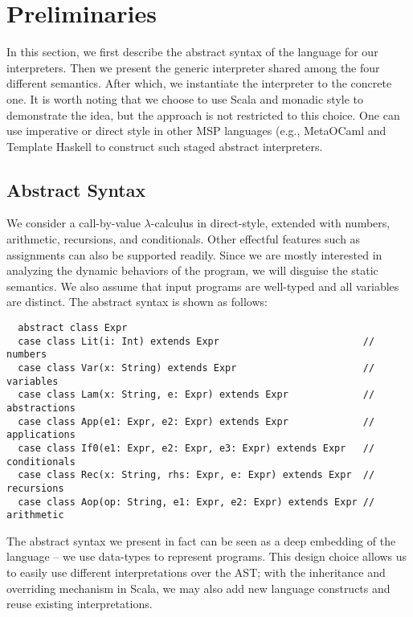 \newcommand{\TLang}{$L_\lambda$}

\section{Preliminaries} \label{prelim}

In this section, we first describe the abstract syntax of the language for our interpreters. 
Then we present the generic interpreter shared among the four different
semantics. After which, we instantiate the interpreter to the concrete one.
It is worth noting that we choose to use Scala and monadic style to
demonstrate the idea, but the approach is not restricted to this
choice. One can use imperative or direct style in other MSP languages
(e.g., MetaOCaml \cite{DBLP:conf/gpce/CalcagnoTHL03, DBLP:conf/flops/Kiselyov14}
and Template Haskell \cite{Sheard:2002:TMH:636517.636528} to construct
such staged abstract interpreters.

\subsection{Abstract Syntax} \label{bg_lang}

We consider a call-by-value $\lambda$-calculus in direct-style, extended
with numbers, arithmetic, recursions, and conditionals. Other effectful features
such as assignments can also be supported readily.
Since we are mostly interested in analyzing the dynamic behaviors of the
program, we will disguise the static semantics. We also assume that
input programs are well-typed and all variables are distinct. The abstract
syntax is shown as follows:
\begin{lstlisting}
  abstract class Expr
  case class Lit(i: Int) extends Expr                         // numbers
  case class Var(x: String) extends Expr                      // variables
  case class Lam(x: String, e: Expr) extends Expr             // abstractions
  case class App(e1: Expr, e2: Expr) extends Expr             // applications
  case class If0(e1: Expr, e2: Expr, e3: Expr) extends Expr   // conditionals
  case class Rec(x: String, rhs: Expr, e: Expr) extends Expr  // recursions
  case class Aop(op: String, e1: Expr, e2: Expr) extends Expr // arithmetic
\end{lstlisting}

The abstract syntax we present in fact can be seen as a deep embedding of the
language -- we use data-types to represent programs. This design choice allows us
to easily use different interpretations over the AST; with the inheritance and
overriding mechanism in Scala, we may also add new language constructs and reuse
existing interpretations.

